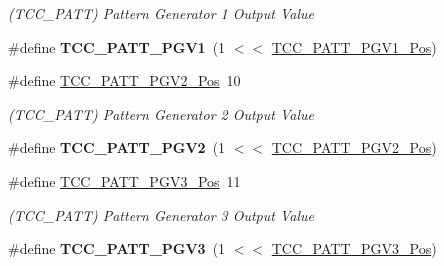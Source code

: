 \begin{DoxyCompactItemize}
\begin{DoxyCompactList}\small\item\em (T\+C\+C\+\_\+\+P\+A\+T\+T) Pattern Generator 1 Output Value \end{DoxyCompactList}\item 
\hypertarget{group___s_a_m_l21___t_c_c_ga261356926e7778d02340b22bbdb6fd45}{}\#define {\bfseries T\+C\+C\+\_\+\+P\+A\+T\+T\+\_\+\+P\+G\+V1}~(1 $<$$<$ \hyperlink{group___s_a_m_l21___t_c_c_ga81052a1e3771a09ae49ee36ce21169f3}{T\+C\+C\+\_\+\+P\+A\+T\+T\+\_\+\+P\+G\+V1\+\_\+\+Pos})\label{group___s_a_m_l21___t_c_c_ga261356926e7778d02340b22bbdb6fd45}

\item 
\hypertarget{group___s_a_m_l21___t_c_c_ga01b2375774b0bd3aee2af9464224b6cf}{}\#define \hyperlink{group___s_a_m_l21___t_c_c_ga01b2375774b0bd3aee2af9464224b6cf}{T\+C\+C\+\_\+\+P\+A\+T\+T\+\_\+\+P\+G\+V2\+\_\+\+Pos}~10\label{group___s_a_m_l21___t_c_c_ga01b2375774b0bd3aee2af9464224b6cf}

\begin{DoxyCompactList}\small\item\em (T\+C\+C\+\_\+\+P\+A\+T\+T) Pattern Generator 2 Output Value \end{DoxyCompactList}\item 
\hypertarget{group___s_a_m_l21___t_c_c_ga2d7616c755d5799fce3430664e5b5714}{}\#define {\bfseries T\+C\+C\+\_\+\+P\+A\+T\+T\+\_\+\+P\+G\+V2}~(1 $<$$<$ \hyperlink{group___s_a_m_l21___t_c_c_ga01b2375774b0bd3aee2af9464224b6cf}{T\+C\+C\+\_\+\+P\+A\+T\+T\+\_\+\+P\+G\+V2\+\_\+\+Pos})\label{group___s_a_m_l21___t_c_c_ga2d7616c755d5799fce3430664e5b5714}

\item 
\hypertarget{group___s_a_m_l21___t_c_c_gad048dba20cd0d61d227e2a0364204229}{}\#define \hyperlink{group___s_a_m_l21___t_c_c_gad048dba20cd0d61d227e2a0364204229}{T\+C\+C\+\_\+\+P\+A\+T\+T\+\_\+\+P\+G\+V3\+\_\+\+Pos}~11\label{group___s_a_m_l21___t_c_c_gad048dba20cd0d61d227e2a0364204229}

\begin{DoxyCompactList}\small\item\em (T\+C\+C\+\_\+\+P\+A\+T\+T) Pattern Generator 3 Output Value \end{DoxyCompactList}\item 
\hypertarget{group___s_a_m_l21___t_c_c_ga9f0263f126c55aafc7c13c3392ee0d8f}{}\#define {\bfseries T\+C\+C\+\_\+\+P\+A\+T\+T\+\_\+\+P\+G\+V3}~(1 $<$$<$ \hyperlink{group___s_a_m_l21___t_c_c_gad048dba20cd0d61d227e2a0364204229}{T\+C\+C\+\_\+\+P\+A\+T\+T\+\_\+\+P\+G\+V3\+\_\+\+Pos})\label{group___s_a_m_l21___t_c_c_ga9f0263f126c55aafc7c13c3392ee0d8f}


\end{DoxyCompactItemize}
